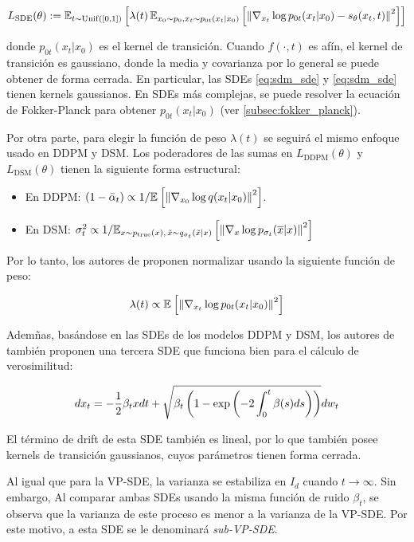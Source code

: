 \begin{equation}
    L_{\text{SDE}}(\theta) := \mathbb{E}_{t\sim\operatorname{Unif}([0,1])}\left[\lambda(t)\,\mathbb{E}_{x_0\sim p_0, x_t\sim p_{0t}(x_t|x_0)}\left[\left\lVert \nabla_{x_t} \log p_{0t}(x_t|x_0) - s_\theta(x_t,t) \right\rVert^2\right]\right]
\end{equation}

donde $p_{0t}(x_t|x_0)$ es el kernel de transición. Cuando $f(\cdot,t)$ es afín, el kernel de transición es gaussiano, donde la media y covarianza por lo general se puede obtener de forma cerrada. En particular, las SDEs \eqref{eq:sdm_sde} y \eqref{eq:sdm_sde} tienen kernels gaussianos. En SDEs más complejas, se puede resolver la ecuación de Fokker-Planck para obtener $p_{0t}(x_t|x_0)$ (ver \autoref{subsec:fokker_planck}).

Por otra parte, para elegir la función de peso $\lambda(t)$ se seguirá el mismo enfoque usado en DDPM y DSM. Los poderadores de las sumas en $L_{\text{DDPM}}(\theta)$ y $L_{\text{DSM}}(\theta)$ tienen la siguiente forma estructural:

\begin{itemize}
    \item En DDPM: $(1-\bar\alpha_t)\propto 1/\mathbb{E}_{}\left[\left\lVert \nabla_{x_0} \log q(x_t|x_0) \right\rVert^2\right]$.
    \item En DSM: $\sigma_t^2\propto 1/\mathbb{E}_{x\sim p_{\operatorname{true}}(x),\,\tilde{x}\sim q_{\sigma_t}(\tilde{x}|x)}\left[\left\lVert \nabla_{x} \log p_{\sigma_t}(\overline{x}|x) \right\rVert^2\right]$
\end{itemize}

Por lo tanto, los autores de \cite{song2021scorebased} proponen normalizar usando la siguiente función de peso:

\begin{equation}
    \lambda(t) \propto \mathbb{E}_{}\left[\left\lVert \nabla_{x_t} \log p_{0t}(x_t|x_0) \right\rVert^2\right]
\end{equation}

Ademñas, basándose en las SDEs de los modelos DDPM y DSM, los autores de \cite{song2021scorebased} también proponen una tercera SDE que funciona bien para el cálculo de verosimilitud:

\begin{equation}
    dx_t = -\frac{1}{2}\beta_t x dt + \sqrt{\beta_t\left(1-\exp\left(-2\int_0^t \beta(s)ds\right)\right)}dw_t
\end{equation}

El término de drift de esta SDE también es lineal, por lo que también posee kernels de transición gaussianos, cuyos parámetros tienen forma cerrada.

Al igual que para la VP-SDE, la varianza se estabiliza en $I_d$ cuando $t\to\infty$. Sin embargo, Al comparar ambas SDEs usando la misma función de ruido $\beta_t$, se observa que la varianza de este proceso es menor a la varianza de la VP-SDE. Por este motivo, a esta SDE se le denominará \textit{sub-VP-SDE}.

